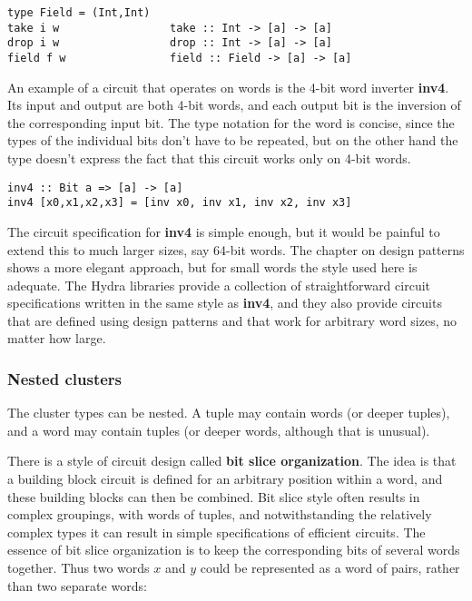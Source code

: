 \documentclass[11pt]{article}
\begin{document}
\begin{enumerate}
\begin{verbatim}
type Field = (Int,Int)
take i w                 take :: Int -> [a] -> [a]
drop i w                 drop :: Int -> [a] -> [a]
field f w                field :: Field -> [a] -> [a]
\end{verbatim}


An example of a circuit that operates on words is the 4-bit word
inverter \textbf{inv4}.  Its input and output are both 4-bit words, and each
output bit is the inversion of the corresponding input bit.  The type
notation for the word is concise, since the types of the individual
bits don't have to be repeated, but on the other hand the type doesn't
express the fact that this circuit works only on 4-bit words.

\begin{verbatim}
inv4 :: Bit a => [a] -> [a]
inv4 [x0,x1,x2,x3] = [inv x0, inv x1, inv x2, inv x3]
\end{verbatim}

The circuit specification for \textbf{inv4} is simple enough, but it would be
painful to extend this to much larger sizes, say 64-bit words.  The
chapter on design patterns shows a more elegant approach, but for
small words the style used here is adequate.  The Hydra libraries
provide a collection of straightforward circuit specifications written
in the same style as \textbf{inv4}, and they also provide circuits that are
defined using design patterns and that work for arbitrary word sizes,
no matter how large.
\end{enumerate}

\subsubsection{Nested clusters}
\label{sec:org5337694}

The cluster types can be nested.  A tuple may contain words (or deeper
tuples), and a word may contain tuples (or deeper words, although that
is unusual).

There is a style of circuit design called \textbf{bit slice
  organization}.  The idea is that a building block circuit is defined
for an arbitrary position within a word, and these building blocks can
then be combined.  Bit slice style often results in complex groupings,
with words of tuples, and notwithstanding the relatively complex types
it can result in simple specifications of efficient circuits.  The
essence of bit slice organization is to keep the corresponding bits of
several words together.  Thus two words \(x\) and \(y\) could be
represented as a word of pairs, rather than two separate words:
\end{document}
